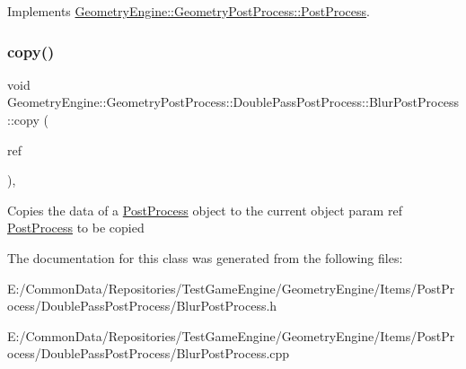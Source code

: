 Implements \mbox{\hyperlink{class_geometry_engine_1_1_geometry_post_process_1_1_post_process_aa80749cf09041335f6b3bda3aaf31711}{Geometry\+Engine\+::\+Geometry\+Post\+Process\+::\+Post\+Process}}.

\mbox{\label{class_geometry_engine_1_1_geometry_post_process_1_1_double_pass_post_process_1_1_blur_post_process_ab3239347164b5c0bbe1b603f4d085181}} 
\subsubsection{\texorpdfstring{copy()}{copy()}}
{\footnotesize\ttfamily void Geometry\+Engine\+::\+Geometry\+Post\+Process\+::\+Double\+Pass\+Post\+Process\+::\+Blur\+Post\+Process\+::copy (\begin{DoxyParamCaption}\item[{const \mbox{\hyperlink{class_geometry_engine_1_1_geometry_post_process_1_1_double_pass_post_process_1_1_blur_post_process}{Blur\+Post\+Process}} \&}]{ref }\end{DoxyParamCaption})\hspace{0.3cm}{\ttfamily [protected]}, {\ttfamily [virtual]}}

Copies the data of a \mbox{\hyperlink{class_geometry_engine_1_1_geometry_post_process_1_1_post_process}{Post\+Process}} object to the current object param ref \mbox{\hyperlink{class_geometry_engine_1_1_geometry_post_process_1_1_post_process}{Post\+Process}} to be copied 

The documentation for this class was generated from the following files\+:\begin{DoxyCompactItemize}
\item 
E\+:/\+Common\+Data/\+Repositories/\+Test\+Game\+Engine/\+Geometry\+Engine/\+Items/\+Post\+Process/\+Double\+Pass\+Post\+Process/Blur\+Post\+Process.\+h\item 
E\+:/\+Common\+Data/\+Repositories/\+Test\+Game\+Engine/\+Geometry\+Engine/\+Items/\+Post\+Process/\+Double\+Pass\+Post\+Process/Blur\+Post\+Process.\+cpp\end{DoxyCompactItemize}
